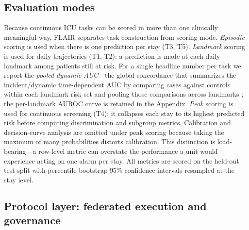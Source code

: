 \documentclass[12pt]{article}
\begin{document}
\subsection*{Evaluation modes}

Because continuous ICU tasks can be scored in more than one clinically meaningful way, FLAIR separates task construction from scoring mode. \emph{Episodic} scoring is used when there is one prediction per stay (T3, T5). \emph{Landmark} scoring is used for daily trajectories (T1, T2): a prediction is made at each daily landmark among patients still at risk. For a single headline number per task we report the \emph{pooled dynamic AUC}---the global concordance that summarizes the incident/dynamic time-dependent AUC by comparing cases against controls within each landmark risk set and pooling those comparisons across landmarks \citep{heagerty2005survivalroc,vanhouwelingen2007landmark}; the per-landmark AUROC curve is retained in the Appendix. \emph{Peak} scoring is used for continuous screening (T4): it collapses each stay to its highest predicted risk before computing discrimination and subgroup metrics. Calibration and decision-curve analysis are omitted under peak scoring because taking the maximum of many probabilities distorts calibration. This distinction is load-bearing---a row-level metric can overstate the performance a unit would experience acting on one alarm per stay. All metrics are scored on the held-out test split with percentile-bootstrap 95\% confidence intervals resampled at the stay level.

\subsection*{Protocol layer: federated execution and governance}
\end{document}
